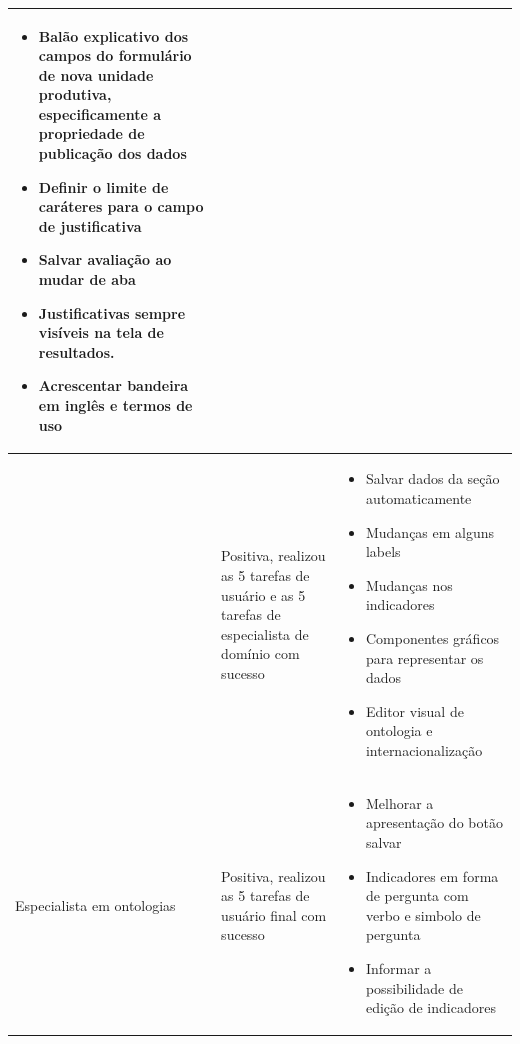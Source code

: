 \begin{longtable}{|>{\centering}p{}|>{\centering}p{}|>{\centering}p{}|}
\begin{itemize}
{usuário}{\small \par}
\item {\small{}Balão explicativo dos campos do formulário de nova unidade
produtiva, especificamente a propriedade de publicação dos dados}{\small \par}
\item {\small{}Definir o limite de caráteres para o campo de justificativa}{\small \par}
\item {\small{}Salvar avaliação ao mudar de aba}{\small \par}
\item {\small{}Justificativas sempre visíveis na tela de resultados.}{\small \par}
\item {\small{}Acrescentar bandeira em inglês e termos de uso}
\end{itemize}
\tabularnewline
\hline 
\hline 
{\small{}Especialista economia} & {\small{}Positiva, realizou as 5 tarefas de usuário e as 5 tarefas
de especialista de domínio com sucesso} & \begin{itemize}
\item {\small{}Salvar dados da seção automaticamente}{\small \par}
\item {\small{}Mudanças em alguns }\foreignlanguage{english}{{\small{}labels}}{\small \par}
\item {\small{}Mudanças nos indicadores}{\small \par}
\item {\small{}Componentes gráficos para representar os dados }{\small \par}
\item {\small{}Editor visual de ontologia e internacionalização}
\end{itemize}
\tabularnewline
\hline 
\hline 
{\small{}Especialista em ontologias} & {\small{}Positiva, realizou as 5 tarefas de usuário final com sucesso} & \begin{itemize}
\item {\small{}Melhorar a apresentação do botão salvar}{\small \par}
\item {\small{}Indicadores em forma de pergunta com verbo e simbolo de pergunta}{\small \par}
\item {\small{}Informar a possibilidade de edição de indicadores }
\end{itemize}

\end{longtable}
